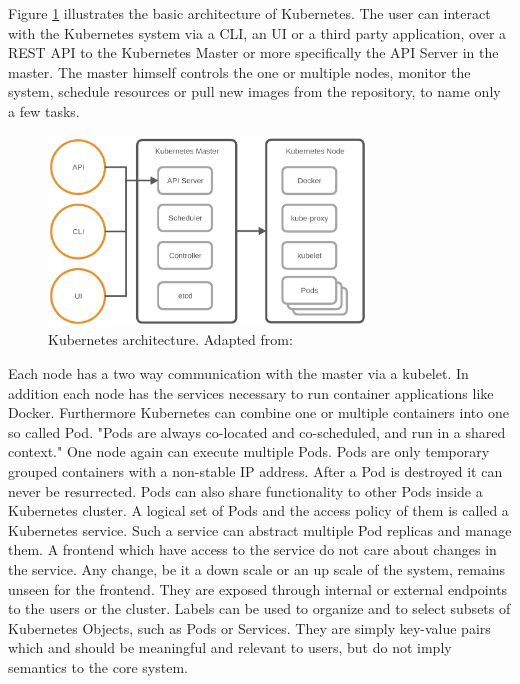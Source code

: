 Figure \ref{fig:kubernetes_architecture} illustrates the basic architecture of Kubernetes.
The user can interact with the Kubernetes system via a \ac{CLI}, an \ac{UI} or a third party application, over a \ac{REST} \ac{API} to the Kubernetes Master or more specifically the \ac{API} Server in the master.
The master himself controls the one or multiple nodes, monitor the system, schedule resources or pull new images from the repository, to name only a few tasks.

\begin{figure}[H]
    \centering
    \includegraphics[width=0.75\textwidth]{resources/images/kubernetes_architecture.png}
    \caption[Kubernetes architecture]{Kubernetes architecture. Adapted from: \cite[p. 4]{MSV:2016}}
    \label{fig:kubernetes_architecture}
\end{figure}

Each node has a two way communication with the master via a kubelet.
In addition each node has the services necessary to run container applications like Docker.
Furthermore Kubernetes can combine one or multiple containers into one so called Pod.\cite[cf.][p. 7]{Mulyana:2016}
"Pods are always co-located and co-scheduled, and run in a shared context."\autocite{Kubernetes:pods:2016}
One node again can execute multiple Pods.
Pods are only temporary grouped containers with a non-stable \ac{IP} address.
After a Pod is destroyed it can never be resurrected.
Pods can also share functionality to other Pods inside a Kubernetes cluster.
A logical set of Pods and the access policy of them is called a Kubernetes service.
Such a service can abstract multiple Pod replicas and manage them.
A frontend which have access to the service do not care about changes in the service.
Any change, be it a down scale or an up scale of the system, remains unseen for the frontend.
They are exposed through internal or external endpoints to the users or the cluster.\cite[cf.][p. 11]{MSV:2016}
Labels can be used to organize and to select subsets of Kubernetes Objects, such as Pods or Services.\cite[cf.]{Kubernetes:labels:2016}
They are simply key-value pairs which and should be meaningful and relevant to users, but do not imply semantics to the core system.\cite[cf.]{Kubernetes:labels:2016}

